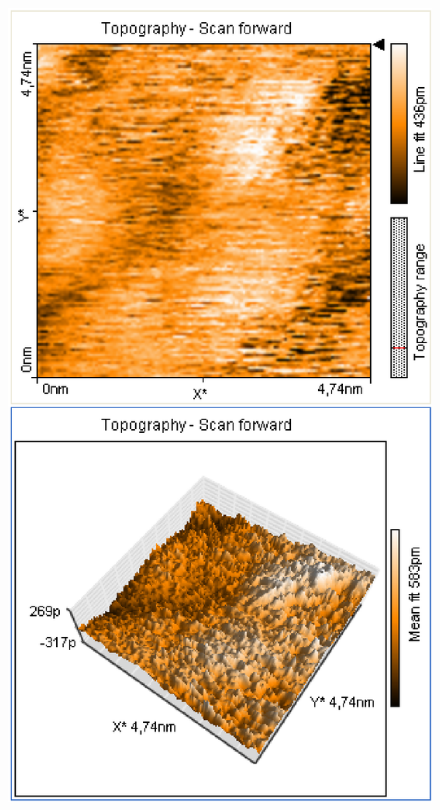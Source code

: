 \documentclass[12pt]{article}
\begin{document}
\begin{figure}[H]  
\begin{minipage}{0.4\linewidth}
\centering
\includegraphics[width=0.9\linewidth]{../plot/data/mos2/mos28.eps}
\end{minipage}
\begin{minipage}{0.2\linewidth}
\centering
\end{minipage}
\begin{minipage}{0.4\linewidth}
\centering

\end{minipage}
\end{figure}
\end{document}
